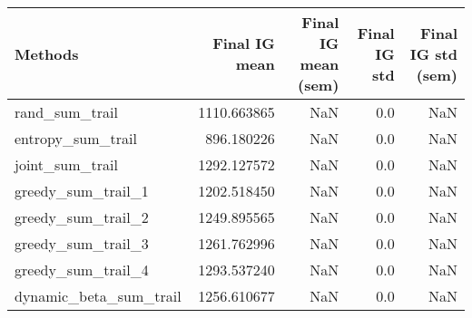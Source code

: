 \begin{tabular}{lrrrr}
\toprule
                Methods &  Final IG mean &  Final IG mean (sem) &  Final IG std &  Final IG std (sem) \\
\midrule
         rand\_sum\_trail &    1110.663865 &                  NaN &           0.0 &                 NaN \\
      entropy\_sum\_trail &     896.180226 &                  NaN &           0.0 &                 NaN \\
        joint\_sum\_trail &    1292.127572 &                  NaN &           0.0 &                 NaN \\
     greedy\_sum\_trail\_1 &    1202.518450 &                  NaN &           0.0 &                 NaN \\
     greedy\_sum\_trail\_2 &    1249.895565 &                  NaN &           0.0 &                 NaN \\
     greedy\_sum\_trail\_3 &    1261.762996 &                  NaN &           0.0 &                 NaN \\
     greedy\_sum\_trail\_4 &    1293.537240 &                  NaN &           0.0 &                 NaN \\
 dynamic\_beta\_sum\_trail &    1256.610677 &                  NaN &           0.0 &                 NaN \\
\bottomrule
\end{tabular}
